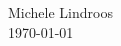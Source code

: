 \documentclass[12pt]{article}
\begin{document}

\begin{center}
\Huge{Michele Lindroos} \\
\normalsize{\today}
\end{center}
\end{document}
